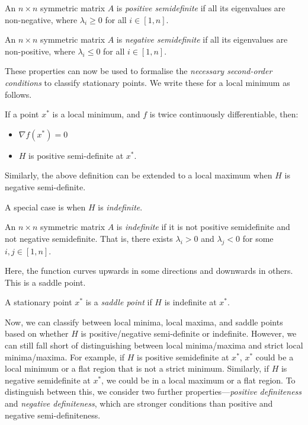 \begin{definition}
    An $n \times n$ symmetric matrix $A$ is \textit{positive semidefinite} if all its eigenvalues are non-negative, where $\lambda_i \geq 0$ for all $i \in [1, n]$.
\end{definition}
\begin{definition}
    An $n \times n$ symmetric matrix $A$ is \textit{negative semidefinite} if all its eigenvalues are non-positive, where $\lambda_i \leq 0$ for all $i \in [1, n]$.
\end{definition}

These properties can now be used to formalise the \textit{necessary second-order conditions} to classify stationary points. We write these for a local minimum as follows.
\begin{definition}
    If a point $x^*$ is a local minimum, and $f$ is twice continuously differentiable, then:
    \begin{itemize}
        \item $\nabla f(x^*) = 0$
        \item $H$ is positive semi-definite at $x^*$.
    \end{itemize}
    \label{definition:second_order_necessary}
\end{definition}
Similarly, the above definition can be extended to a local maximum when $H$ is negative semi-definite.

A special case is when $H$ is \textit{indefinite}.
\begin{definition}
    An $n \times n$ symmetric matrix $A$ is \textit{indefinite} if it is not positive semidefinite and not negative semidefinite. That is, there exists $\lambda_i > 0$ and $\lambda_j < 0$ for some $i, j \in [1, n]$.
\end{definition}
Here, the function curves upwards in some directions and downwards in others. This is a saddle point.

\begin{definition}
    A stationary point $x^*$ is a \textit{saddle point} if $H$ is indefinite at $x^*$.
\end{definition}

Now, we can classify between local minima, local maxima, and saddle points based on whether $H$ is positive/negative semi-definite or indefinite. However, we can still fall short of distinguishing between local minima/maxima and strict local minima/maxima. For example, if $H$ is positive semidefinite at $x^*$, $x^*$ could be a local minimum or a flat region that is not a strict minimum. Similarly, if $H$ is negative semidefinite at $x^*$, we could be in a local maximum or a flat region. To distinguish between this, we consider two further properties---\textit{positive definiteness} and \textit{negative definiteness}, which are stronger conditions than positive and negative semi-definiteness.

